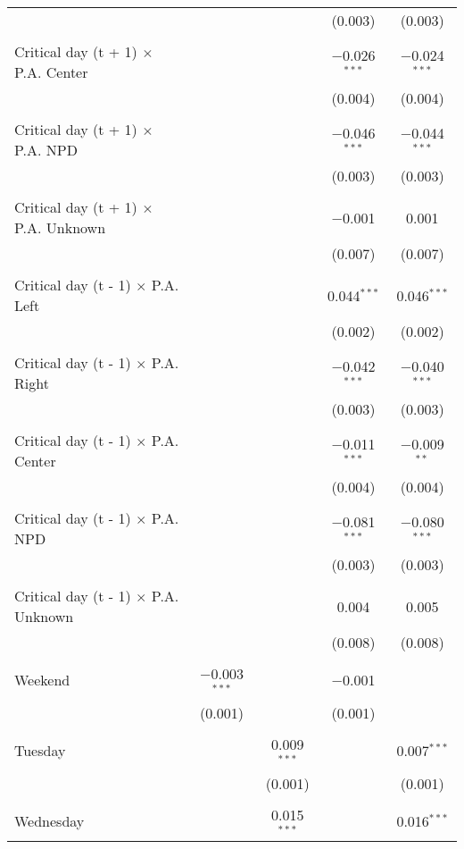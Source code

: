 \documentclass[
]{article}
\begin{document}
\begin{table}[!htbp]
{\begin{tabular}{@{\extracolsep{5pt}}lcccc}
  &  &  & (0.003) & (0.003) \\ 
  & & & & \\ 
 Critical day (t + 1) $\times$ P.A. Center &  &  & $-$0.026$^{***}$ & $-$0.024$^{***}$ \\ 
  &  &  & (0.004) & (0.004) \\ 
  & & & & \\ 
 Critical day (t + 1) $\times$ P.A. NPD &  &  & $-$0.046$^{***}$ & $-$0.044$^{***}$ \\ 
  &  &  & (0.003) & (0.003) \\ 
  & & & & \\ 
 Critical day (t + 1) $\times$ P.A. Unknown &  &  & $-$0.001 & 0.001 \\ 
  &  &  & (0.007) & (0.007) \\ 
  & & & & \\ 
 Critical day (t - 1) $\times$ P.A. Left &  &  & 0.044$^{***}$ & 0.046$^{***}$ \\ 
  &  &  & (0.002) & (0.002) \\ 
  & & & & \\ 
 Critical day (t - 1) $\times$ P.A. Right &  &  & $-$0.042$^{***}$ & $-$0.040$^{***}$ \\ 
  &  &  & (0.003) & (0.003) \\ 
  & & & & \\ 
 Critical day (t - 1) $\times$ P.A. Center &  &  & $-$0.011$^{***}$ & $-$0.009$^{**}$ \\ 
  &  &  & (0.004) & (0.004) \\ 
  & & & & \\ 
 Critical day (t - 1) $\times$ P.A. NPD &  &  & $-$0.081$^{***}$ & $-$0.080$^{***}$ \\ 
  &  &  & (0.003) & (0.003) \\ 
  & & & & \\ 
 Critical day (t - 1) $\times$ P.A. Unknown &  &  & 0.004 & 0.005 \\ 
  &  &  & (0.008) & (0.008) \\ 
  & & & & \\ 
 Weekend & $-$0.003$^{***}$ &  & $-$0.001 &  \\ 
  & (0.001) &  & (0.001) &  \\ 
  & & & & \\ 
 Tuesday &  & 0.009$^{***}$ &  & 0.007$^{***}$ \\ 
  &  & (0.001) &  & (0.001) \\ 
  & & & & \\ 
 Wednesday &  & 0.015$^{***}$ &  & 0.016$^{***}$ \\ 

\end{tabular}}
\end{table}
\end{document}
